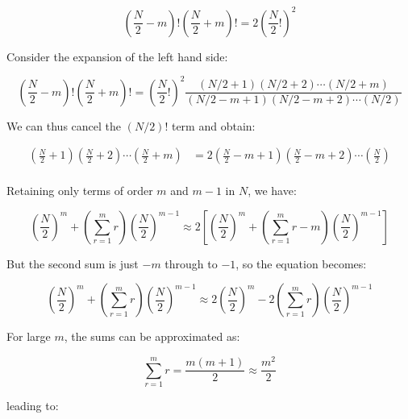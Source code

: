 \documentclass[12pt]{article}
\begin{document}
\begin{equation}
    \left( \frac{N}{2} - m \right)! \left( \frac{N}{2} + m \right)! = 2 \left( \frac{N}{2}! \right)^{2}
\end{equation}

Consider the expansion of the left hand side:

\begin{equation}
    \left( \frac{N}{2} - m \right)! \left( \frac{N}{2} + m \right)! = \left( \frac{N}{2}! \right)^{2} \frac{(N/2 + 1)(N/2 + 2) \cdots (N/2 + m)}{(N/2 - m + 1)(N/2 - m + 2) \cdots (N/2)}
\end{equation}

We can thus cancel the $(N/2)!$ term and obtain:

\begin{equation}
    \begin{split}
        \left( \frac{N}{2} + 1 \right) \left( \frac{N}{2} + 2 \right) \cdots \left( \frac{N}{2} + m \right) &= 2 \left( \frac{N}{2} - m + 1 \right) \left( \frac{N}{2} - m + 2 \right) \cdots \left( \frac{N}{2} \right) \\
    \end{split}
\end{equation}

Retaining only terms of order $m$ and $m - 1$ in $N$, we have:

\begin{equation}
    \left( \frac{N}{2} \right)^{m} + \left( \sum_{r = 1}^{m} r \right) \left( \frac{N}{2} \right)^{m - 1} \approx 2 \left[ \left( \frac{N}{2} \right)^{m} + \left( \sum_{r = 1}^{m} r - m \right) \left( \frac{N}{2} \right)^{m - 1} \right]
\end{equation}

But the second sum is just $-m$ through to $-1$, so the equation becomes:

\begin{equation}
    \left( \frac{N}{2} \right)^{m} + \left( \sum_{r = 1}^{m} r \right) \left( \frac{N}{2} \right)^{m - 1} \approx 2 \left( \frac{N}{2} \right)^{m} - 2 \left( \sum_{r = 1}^{m} r \right) \left( \frac{N}{2} \right)^{m - 1}
\end{equation}

For large $m$, the sums can be approximated as:

\begin{equation}
    \sum_{r = 1}^{m} r = \frac{m(m + 1)}{2} \approx \frac{m^{2}}{2}
\end{equation}

leading to:
\end{document}
